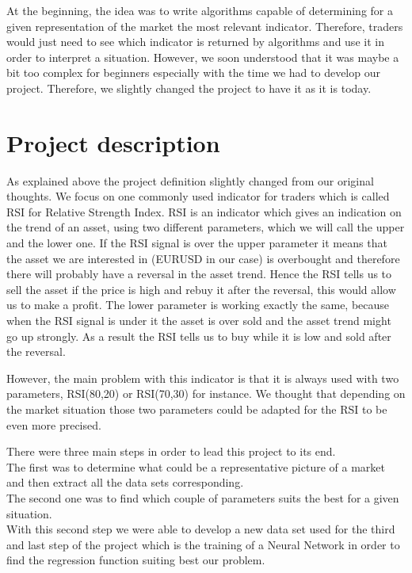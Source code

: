 \documentclass[]{article}
\begin{document}
\vskip 0.3cm 
At the beginning, the idea was to write algorithms capable of determining for a given representation of the market the most relevant indicator. Therefore, traders would just need to see which indicator is returned by algorithms and use it in order to interpret a situation. However, we soon understood that it was maybe a bit too complex for beginners especially with the time we had to develop our project.
Therefore, we slightly changed the project to have it as it is today.

\section{Project description}

\vskip 0.3cm
As explained above the project definition slightly changed from our original thoughts. We focus on one commonly used indicator for traders which is called RSI for Relative Strength Index. RSI is an indicator which gives an indication on the trend of an asset, using two different parameters, which we will call the upper and the lower one. If the RSI signal is over the upper parameter it means that the asset we are interested in (EURUSD in our case) is overbought and therefore there will probably have a reversal in the asset trend. Hence the RSI tells us to sell the asset if the price is high and rebuy it after the reversal, this would allow us to make a profit. The lower parameter is working exactly the same, because when the RSI signal is under it the asset is over sold and the asset trend might go up strongly. As a result the RSI tells us to buy while it is low and sold after the reversal.

\vskip 0.3cm
However, the main problem with this indicator is that it is always used with two parameters, RSI(80,20) or RSI(70,30) for instance. We thought that depending on the market situation those two parameters could be adapted  for the RSI to be even more precised. 

\vskip 0.3cm
There were three main steps in order to lead this project to its end.\\
The first was to determine what could be a representative picture of a market and then extract all the data sets corresponding.\\
The second one was to find which couple of parameters suits the best for a given situation.\\
With this second step we were able to develop a new data set used for the third and last step of the project which is the training of a Neural Network in order to find the regression function suiting best our problem.  
\end{document}
